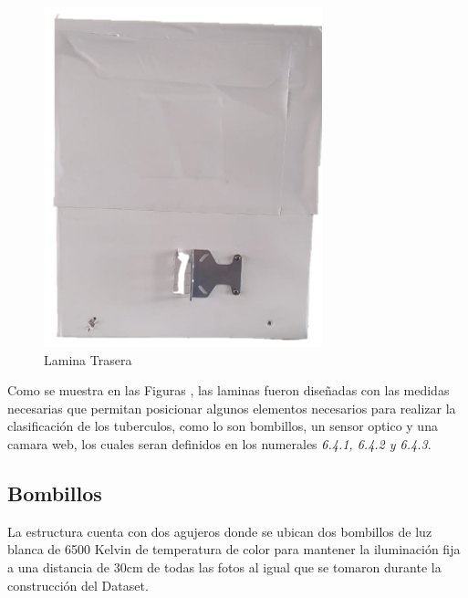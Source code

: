 \begin{figure}[ht]
\begin{minipage}[b]{0.25\linewidth}
				\includegraphics[width=\linewidth]{Figs/303.png}
				\caption{Lamina Trasera}
				\label{fig:trasera}
			\end{minipage}
		\end{figure}
				
		Como se muestra en las Figuras , las laminas fueron diseñadas con las medidas necesarias que permitan posicionar algunos elementos necesarios para realizar la clasificación de los tuberculos, como lo son bombillos, un sensor optico y una camara web, los cuales seran definidos en los numerales \textit{6.4.1, 6.4.2 y 6.4.3}.

		\subsection{Bombillos}
			La estructura cuenta con dos agujeros donde se ubican dos bombillos de luz blanca de 6500 Kelvin de temperatura de color para mantener la iluminación fija a una distancia de 30cm de todas las fotos al igual que se tomaron durante la construcción del Dataset.
